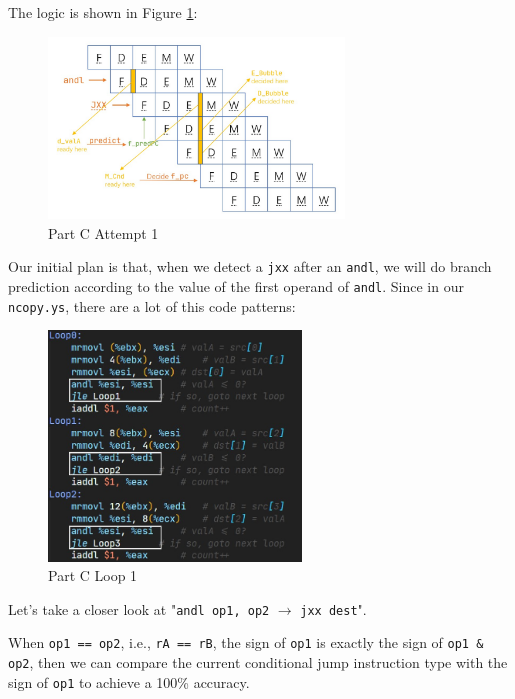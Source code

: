 \documentclass{article}
\begin{document}
The logic is shown in Figure \ref{Fig.partC-attempt1}:
\begin{figure}[H] %
        \centering %
        \includegraphics[width=0.7\textwidth]{partC-attempt1.jpg} %
        \caption{Part C Attempt 1} %
        \label{Fig.partC-attempt1} %
\end{figure}
Our initial plan is that, when we detect a \texttt{jxx} after an \texttt{andl}, 
we will do branch prediction according to the value of the first operand of \texttt{andl}. 
Since in our \texttt{ncopy.ys}, there are a lot of this code patterns:
\begin{figure}[H] %
        \centering %
        \includegraphics[width=0.6\textwidth]{partC-loop-demo.jpg} %
        \caption{Part C Loop 1} %
        \label{Fig.partC-at1-loop} %
\end{figure}
Let's take a closer look at "\texttt{andl op1, op2} $\rightarrow$ \texttt{jxx dest}".

When \texttt{op1 == op2}, i.e., \texttt{rA == rB}, the sign of \texttt{op1} is exactly the sign of \texttt{op1 \& op2}, then we can compare the current conditional jump instruction type with the sign of \texttt{op1} to achieve a 100\% accuracy. 
\end{document}
